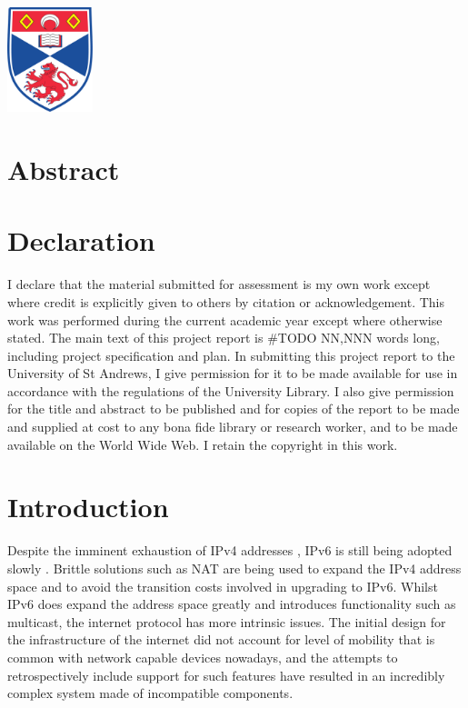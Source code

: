 \documentclass[12pt]{article}
\begin{document}
\begin{titlepage}
\includegraphics[width = 2.5cm]{images/standrewslogo.png}
 

\vfill %

\end{titlepage}


\section*{Abstract}

\section*{Declaration}
I declare that the material submitted for
assessment is my own work except where credit is
explicitly given to others by citation or
acknowledgement. This work was performed during
the current academic year except where otherwise
stated.
The main text of this project report is \#TODO NN,NNN
words long, including project specification and plan.
In submitting this project report to the University of
St Andrews, I give permission for it to be made
available for use in accordance with the regulations of
the University Library. I also give permission for
the title and abstract to be published and for copies of
the report to be made and supplied at cost to any bona
fide library or research worker, and to be made
available on the World Wide Web. I retain the
copyright in this work.

\newpage

\tableofcontents

\newpage
{}
\setcounter{page}{1} 

\section{Introduction}

Despite the imminent exhaustion of IPv4 addresses \cite{ripe_labs}, IPv6 is still being adopted slowly \cite{google_ipv6}. Brittle solutions such as NAT are being used to expand the IPv4 address space and to avoid the transition costs involved in upgrading to IPv6. Whilst IPv6 does expand the address space greatly and introduces functionality such as multicast, the internet protocol has more intrinsic issues. The initial design for the infrastructure of the internet did not account for level of mobility that is common with network capable devices nowadays, and the attempts to retrospectively include support for such features have resulted in an incredibly complex system made of incompatible components. 
\end{document}
